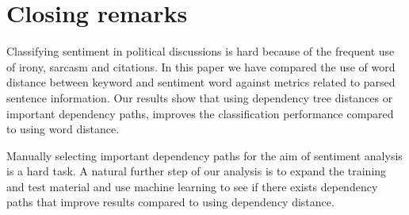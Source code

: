 \documentclass[11pt]{article}
\begin{document}
\section{Closing remarks}
\label{sec:cr}

Classifying sentiment in political discussions is hard because of the frequent use of irony, sarcasm and citations. In this paper we have compared the use of word distance between keyword and sentiment word against metrics related to parsed sentence information. Our results show that using dependency tree distances or important dependency paths, improves the classification performance compared to using word distance. 

Manually selecting important dependency paths for the aim of sentiment analysis is a hard task. A natural further step of our analysis is to expand the training and test material and use machine learning to see if there exists dependency paths that improve results compared to using dependency distance.


\end{document}
